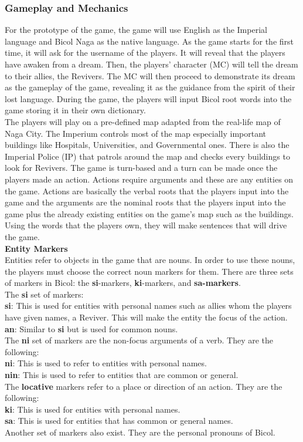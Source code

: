 \documentclass[11pt]{article}
\begin{document}
\subsubsection{Gameplay and Mechanics}
For the prototype of the game, the game will use English as the Imperial language and Bicol Naga as the native language. As the game starts for the first time, it will ask for the username of the players. It will reveal that the players have awaken from a dream. Then, the players' character (MC) will tell the dream to their allies, the Revivers. The MC will then proceed to demonstrate its dream as the gameplay of the game, revealing it as the guidance from the spirit of their lost language. During the game, the players will input Bicol root words into the game storing it in their own dictionary.\\
The players will play on a pre-defined map adapted from the real-life map of Naga City. The Imperium controls most of the map especially important buildings like Hospitals, Universities, and Governmental ones. There is also the Imperial Police (IP) that patrols around the map and checks every buildings to look for Revivers. The game is turn-based and a turn can be made once the players made an action. Actions require arguments and these are any entities on the game. Actions are basically the verbal roots that the players input into the game and the arguments are the nominal roots that the players input into the game plus the already existing entities on the game's map such as the buildings. Using the words that the players own, they will make sentences that will drive the game.\\

\textbf{Entity Markers}\\
Entities refer to objects in the game that are nouns. In order to use these nouns, the players must choose the correct noun markers for them. There are three sets of markers in Bicol: the \textbf{si}-markers, \textbf{ki}-markers, and \textbf{sa-markers}.\\
The \textbf{si} set of markers:\\
\textbf{si}: This is used for entities with personal names such as allies whom the players have given names, a Reviver. This will make the entity the focus of the action.
\textbf{an}: Similar to \textbf{si} but is used for common nouns.\\
The \textbf{ni} set of markers are the non-focus arguments of a verb. They are the following:\\
\textbf{ni}: This is used to refer to entities with personal names.\\
\textbf{nin}: This is used to refer to entities that are common or general.\\
The \textbf{locative} markers refer to a place or direction of an action. They are the following:\\
\textbf{ki}: This is used for entities with personal names.\\
\textbf{sa}: This is used for entities that has common or general names.\\
Another set of markers also exist. They are the personal pronouns of Bicol.\\
\end{document}
